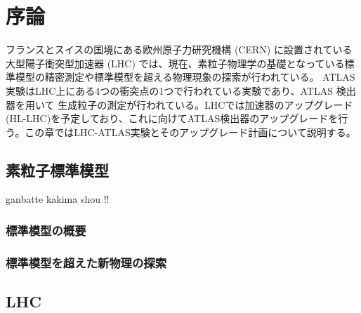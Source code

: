 \chapter{序論}
\label{sec:josho}

フランスとスイスの国境にある欧州原子力研究機構 (CERN) に設置されている大型陽子衝突型加速器 (LHC) では、現在、素粒子物理学の基礎となっている標準模型の精密測定や標準模型を超える物理現象の探索が行われている。 ATLAS実験はLHC上にある4つの衝突点の1つで行われている実験であり、ATLAS 検出器を用いて 生成粒子の測定が行われている。LHCでは加速器のアップグレード(HL-LHC)を予定しており、これに向けてATLAS検出器のアップグレードを行う。この章ではLHC-ATLAS実験とそのアップグレード計画について説明する。



\section{素粒子標準模型}
\label{sec:}
ganbatte kakima shou !!




\subsection{標準模型の概要}
\label{sec:}





\subsection{標準模型を超えた新物理の探索}
\label{sec:}





\section{LHC}
\label{sec:LHC}

